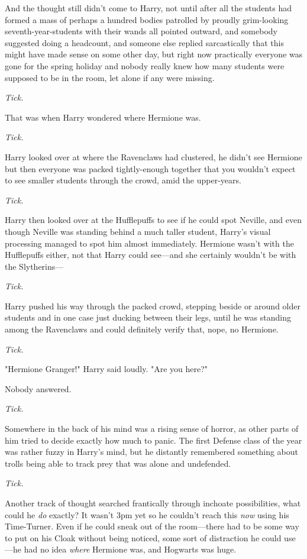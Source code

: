 And the thought still didn't come to Harry, not until after all the students had formed a mass of perhaps a hundred bodies patrolled by proudly grim-looking seventh-year-students with their wands all pointed outward, and somebody suggested doing a headcount, and someone else replied sarcastically that this might have made sense on some other day, but right now practically everyone was gone for the spring holiday and nobody really knew how many students were supposed to be in the room, let alone if any were missing.

\emph{Tick.}

That was when Harry wondered where Hermione was.

\emph{Tick.}

Harry looked over at where the Ravenclaws had clustered, he didn't see Hermione but then everyone was packed tightly-enough together that you wouldn't expect to see smaller students through the crowd, amid the upper-years.

\emph{Tick.}

Harry then looked over at the Hufflepuffs to see if he could spot Neville, and even though Neville was standing behind a much taller student, Harry's visual processing managed to spot him almost immediately. Hermione wasn't with the Hufflepuffs either, not that Harry could see---and she certainly wouldn't be with the Slytherins---

\emph{Tick.}

Harry pushed his way through the packed crowd, stepping beside or around older students and in one case just ducking between their legs, until he was standing among the Ravenclaws and could definitely verify that, nope, no Hermione.

\emph{Tick.}

"Hermione Granger!" Harry said loudly. "Are you here?"

Nobody answered.

\emph{Tick.}

Somewhere in the back of his mind was a rising sense of horror, as other parts of him tried to decide exactly how much to panic. The first Defense class of the year was rather fuzzy in Harry's mind, but he distantly remembered something about trolls being able to track prey that was alone and undefended.

\emph{Tick.}

Another track of thought searched frantically through inchoate possibilities, what could he \emph{do} exactly? It wasn't 3pm yet so he couldn't reach this \emph{now} using his Time-Turner. Even if he could sneak out of the room---there had to be some way to put on his Cloak without being noticed, some sort of distraction he could use---he had no idea \emph{where} Hermione was, and Hogwarts was huge.

